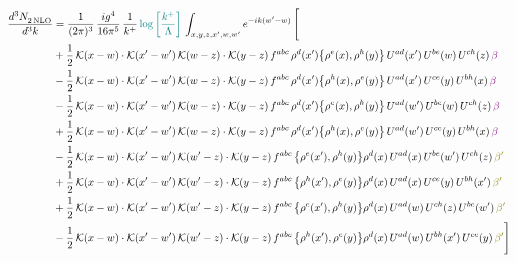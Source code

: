 \documentclass[9pt]{article}
\numberwithin{equation}{section}
\begin{document}
\begin{align}
    \frac{d^{3}N_{2\,\rm NLO}^{\rm}}{d^{3}k}  & = \frac{1}{(2\pi)^{3}}\, \frac{ig^{4}}{16\pi^{5}}\, \frac{1}{k^{+}}\, {\color{teal}\log{\left[\frac{k^{+}}{\Lambda}\right]}}\, \int_{x,y,z,x^{\prime},w,w^{\prime}}e^{-ik(w^{\prime}-w)}\, \Bigg[\notag \\ & +\frac{1}{2}\,\mathcal{K}(x-w)\cdot\mathcal{K}(x'-w')\,\mathcal{K}(w-z)\cdot\mathcal{K}(y-z)\, f^{abc}\,\rho^{d}(x')\big\{\rho^{e}(x),\rho^{h}(y)\big\}\,U^{ad}(x')\,U^{be}(w)\,U^{ch}(z)\,{\color{violet} \beta}\notag\\ &-\frac{1}{2}\,\mathcal{K}(x-w)\cdot\mathcal{K}(x'-w')\,\mathcal{K}(w-z)\cdot\mathcal{K}(y-z)\, f^{abc}\,\rho^{d}(x')\big\{\rho^{h}(x),\rho^{e}(y)\big\}\,U^{ad}(x')\,U^{ce}(y)\,U^{bh}(x)\,{\color{violet} \beta}\notag\\ &-\frac{1}{2}\,\mathcal{K}(x-w)\cdot\mathcal{K}(x'-w')\,\mathcal{K}(w-z)\cdot\mathcal{K}(y-z)\, f^{abc}\,\rho^{d}(x')\big\{\rho^{e}(x),\rho^{h}(y)\big\}\,U^{ad}(w')\,U^{be}(w)\,U^{ch}(z)\,{\color{violet} \beta}\notag \\ &+\frac{1}{2}\,\mathcal{K}(x-w)\cdot\mathcal{K}(x'-w')\,\mathcal{K}(w-z)\cdot\mathcal{K}(y-z)\, f^{abc}\,\rho^{d}(x')\big\{\rho^{h}(x),\rho^{e}(y)\big\}\,U^{ad}(w')\,U^{ce}(y)\,U^{bh}(x)\,{\color{violet} \beta}\notag\\
&-\frac{1}{2}\,\mathcal{K}(x-w)\cdot\mathcal{K}(x'-w')\,\mathcal{K}(w'-z)\cdot\mathcal{K}(y-z)\, f^{abc}\,\big\{\rho^{e}(x'),\rho^{h}(y)\big\}\rho^{d}(x)\,U^{ad}(x)\,U^{be}(w')\,U^{ch}(z)\,{\color{olive} \beta'}\notag \\ & +\frac{1}{2}\,\mathcal{K}(x-w)\cdot\mathcal{K}(x'-w')\,\mathcal{K}(w'-z)\cdot\mathcal{K}(y-z)\, f^{abc}\,\big\{\rho^{h}(x'),\rho^{e}(y)\big\}\rho^{d}(x)\,U^{ad}(x)\,U^{ce}(y)\,U^{bh}(x')\,{\color{olive} \beta'} \notag\\ & +\frac{1}{2}\,\mathcal{K}(x-w)\cdot\mathcal{K}(x'-w')\,\mathcal{K}(w'-z)\cdot\mathcal{K}(y-z)\, f^{abc}\,\big\{\rho^{e}(x'),\rho^{h}(y)\big\}\rho^{d}(x)\,U^{ad}(w)\,U^{ch}(z)\,U^{be}(w')\,{\color{olive} \beta'} \notag\\
& -\frac{1}{2}\,\mathcal{K}(x-w)\cdot\mathcal{K}(x'-w')\,\mathcal{K}(w'-z)\cdot\mathcal{K}(y-z)\, f^{abc}\,\big\{\rho^{h}(x'),\rho^{e}(y)\big\}\rho^{d}(x)\,U^{ad}(w)\,U^{bh}(x')\,U^{ce}(y)\,{\color{olive} \beta'}\Bigg]
\end{align}
\end{document}
